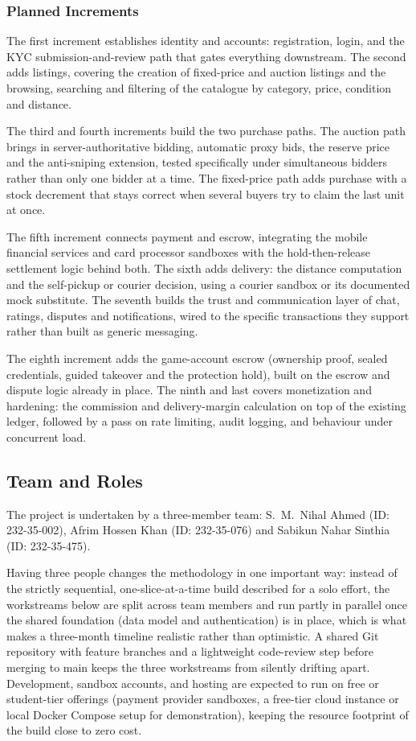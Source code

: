 \documentclass[11pt,a4paper]{article}
\begin{document}
\subsubsection*{Planned Increments}

The first increment establishes identity and accounts: registration, login, and the KYC
submission-and-review path that gates everything downstream. The second adds listings, covering the
creation of fixed-price and auction listings and the browsing, searching and filtering of the catalogue
by category, price, condition and distance.

The third and fourth increments build the two purchase paths. The auction path brings in
server-authoritative bidding, automatic proxy bids, the reserve price and the anti-sniping extension,
tested specifically under simultaneous bidders rather than only one bidder at a time. The fixed-price path
adds purchase with a stock decrement that stays correct when several buyers try to claim the last unit at
once.

The fifth increment connects payment and escrow, integrating the mobile financial services and card
processor sandboxes with the hold-then-release settlement logic behind both. The sixth adds delivery: the
distance computation and the self-pickup or courier decision, using a courier sandbox or its documented mock
substitute. The seventh builds the trust and communication layer of chat, ratings, disputes and
notifications, wired to the specific transactions they support rather than built as generic messaging.

The eighth increment adds the game-account escrow (ownership proof, sealed credentials, guided takeover and
the protection hold), built on the escrow and dispute logic already in place. The ninth and last covers
monetization and hardening: the commission and delivery-margin calculation on top of the existing ledger,
followed by a pass on rate limiting, audit logging, and behaviour under concurrent load.

\subsection{Team and Roles}

The project is undertaken by a three-member team: S.\ M.\ Nihal Ahmed (ID: 232-35-002), Afrim Hossen Khan
(ID: 232-35-076) and Sabikun Nahar Sinthia (ID: 232-35-475).

Having three people changes the methodology in one important way: instead of the strictly sequential,
one-slice-at-a-time build described for a solo effort, the workstreams below are split across team members
and run partly in parallel once the shared foundation (data model and authentication) is in place, which is
what makes a three-month timeline realistic rather than optimistic. A shared Git repository with feature
branches and a lightweight code-review step before merging to main keeps the three workstreams from silently
drifting apart. Development, sandbox accounts, and hosting are expected to run on free or student-tier
offerings (payment provider sandboxes, a free-tier cloud instance or local Docker Compose setup for
demonstration), keeping the resource footprint of the build close to zero cost.
\end{document}
